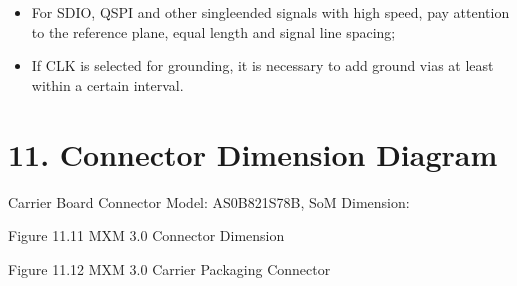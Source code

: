\documentclass[letterpaper,10pt,openany,english]{sphinxmanual}
\begin{document}
\sphinxAtStartPar
{}
\begin{itemize}
\item {} 
\sphinxAtStartPar
For SDIO, QSPI and other single\sphinxhyphen{}ended signals with high speed, pay attention to the reference plane, equal length and signal line spacing;

\item {} 
\sphinxAtStartPar
If CLK is selected for grounding, it is necessary to add ground vias at least within a certain interval.

\end{itemize}


\chapter{11. Connector Dimension Diagram}
\label{\detokenize{hardware:connector-dimension-diagram}}
\sphinxAtStartPar
Carrier Board Connector Model: AS0B821\sphinxhyphen{}S78B, SoM Dimension:

\sphinxAtStartPar
{}

\sphinxAtStartPar
Figure 11.1\sphinxhyphen{}1 MXM 3.0 Connector Dimension

\sphinxAtStartPar
{}

\sphinxAtStartPar
Figure 11.1\sphinxhyphen{}2 MXM 3.0 Carrier Packaging Connector



\renewcommand{\indexname}{Index}
\printindex
\end{document}
